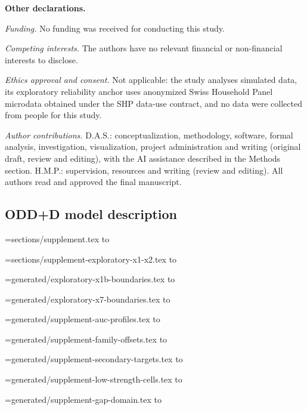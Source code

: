 \documentclass[pdflatex,sn-mathphys-num,iicol]{sn-jnl}
\begin{document}
\noindent\textbf{Other declarations.}

\noindent\emph{Funding.} No funding was received for conducting this study.

\noindent\emph{Competing interests.} The authors have no relevant financial or non-financial interests to disclose.

\noindent\emph{Ethics approval and consent.} Not applicable: the study analyses simulated data, its exploratory reliability anchor uses anonymized Swiss Household Panel microdata obtained under the SHP data-use contract, and no data were collected from people for this study.

\noindent\emph{Author contributions.} D.A.S.: conceptualization, methodology, software, formal analysis, investigation, visualization, project administration and writing (original draft, review and editing), with the AI assistance described in the Methods section. H.M.P.: supervision, resources and writing (review and editing). All authors read and approved the final manuscript.

\begin{appendices}
\section{ODD+D model description}\label{app:odd}

\end{appendices}



\clearpage
\setcounter{table}{0}
\setcounter{figure}{0}
\renewcommand{\thetable}{S\arabic{table}}
\renewcommand{\thefigure}{S\arabic{figure}}
\ifdefined\theHtable
  \renewcommand{\theHtable}{supp.\arabic{table}}
\fi
\ifdefined\theHfigure
  \renewcommand{\theHfigure}{supp.\arabic{figure}}
\fi

\newif\ifsupplementcontent
\newread\supplementstream
\newcommand{\checksupplementcontent}[1]{%
  \begingroup
  \endlinechar=-1
  \openin\supplementstream=#1.tex
  \loop\unless\ifeof\supplementstream
    \read\supplementstream to \supplementline
    \unless\ifeof\supplementstream
      \ifx\supplementline\empty\else
        \global\supplementcontenttrue
      \fi
    \fi
  \repeat
  \closein\supplementstream
  \endgroup
}
\checksupplementcontent{sections/supplement}
\checksupplementcontent{sections/supplement-exploratory-x1-x2}
\checksupplementcontent{generated/exploratory-x1b-boundaries}
\checksupplementcontent{generated/exploratory-x7-boundaries}
\checksupplementcontent{generated/supplement-auc-profiles}
\checksupplementcontent{generated/supplement-family-offsets}
\checksupplementcontent{generated/supplement-secondary-targets}
\checksupplementcontent{generated/supplement-low-strength-cells}
\checksupplementcontent{generated/supplement-gap-domain}
\ifsupplementcontent
\end{document}
